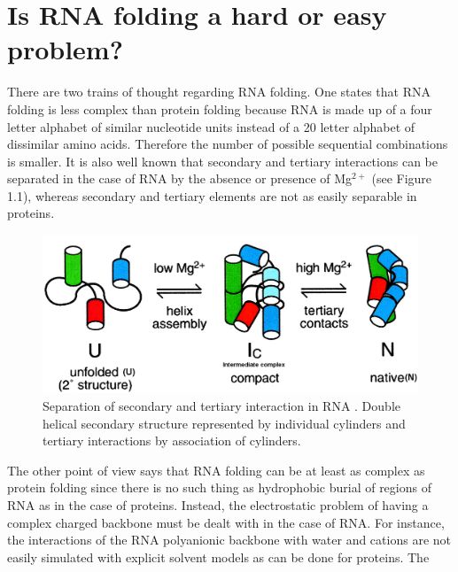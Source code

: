 \section{Is RNA folding a hard or easy problem?}
There are two trains of thought regarding RNA folding. One states that
RNA  folding is  less complex  than protein  folding \cite{tinoco1999}
because RNA is made up of a four letter alphabet of similar nucleotide
units   instead  of  a   20  letter   alphabet  of   dissimilar  amino
acids.  Therefore the  number of  possible sequential  combinations is
smaller.  It   is  also  well   known  that  secondary   and  tertiary
interactions can  be separated in  the case of  RNA by the  absence or
presence  of  Mg$^{2+}$ \cite{rangan2003}  (see  Figure 1.1),  whereas
secondary  and  tertiary  elements  are  not as  easily  separable  in
proteins.
\begin{figure}[ht]
\centering
\includegraphics[scale=0.3]{Chapter1/rangan2003pnas.png}
\caption{Separation of secondary and tertiary interaction in
RNA \cite{rangan2003}. Double helical secondary structure
represented  by individual cylinders and tertiary interactions by
association of cylinders.}
\end{figure}
The  other point of  view says  that RNA  folding can  be at  least as
complex as protein folding \cite{moore1999a, sorin2004} since there is
no such thing  as hydrophobic burial of regions of RNA  as in the case
of proteins.  Instead, the electrostatic  problem of having  a complex
charged backbone must be dealt with in the case of RNA.
For instance,  the interactions of  the RNA polyanionic  backbone with
water  and cations  \cite{klein2004a}  are not  easily simulated  with
explicit   solvent  models   as  can   be  done   for   proteins.  The
